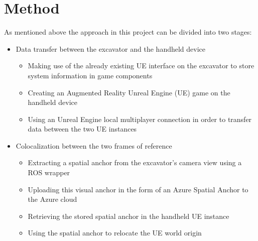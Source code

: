 \chapter{Method}\label{ch:method}

As mentioned above the approach in this project can be divided into two stages:

\begin{itemize}
    \item Data transfer between the excavator and the handheld device
    \begin{itemize}
        \item Making use of the already existing UE interface on the excavator to store system information in game components
        \item Creating an Augmented Reality Unreal Engine (UE) game on the handheld device
        \item Using an Unreal Engine local multiplayer connection in order to transfer data between the two UE instances
    \end{itemize}
    \item Colocalization between the two frames of reference 
    \begin{itemize}
        \item Extracting a spatial anchor from the excavator's camera view using a ROS wrapper 
        \item Uploading this visual anchor in the form of an Azure Spatial Anchor to the Azure cloud
        \item Retrieving the stored spatial anchor in the handheld UE instance 
        \item Using the spatial anchor to relocate the UE world origin
    \end{itemize}
\end{itemize}


